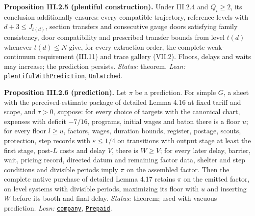 \documentclass[
  letterpaper,
  11pt]{article}
\begin{document}
\textbf{Proposition III.2.5 (plentiful construction).} Under III.2.4 and
\(Q_i\ge2\), its conclusion additionally ensures: every compatible
trajectory, reference levels with \(d+3\le J_{t(d)}\), section transfers
and consecutive gauge doors satisfying family consistency, door
compatibility and prescribed transfer bounds from level \(t(d)\)
whenever \(t(d)\le N\) give, for every extraction order, the complete
weak-continuum requirement (III.11) and trace gallery (VII.2). Floors,
delays and waits may increase; the prediction persists. \emph{Status:}
theorem. \emph{Lean:}
\href{https://github.com/yang-mills-group/OpenAI-YM-20261028/blob/3456e5e75cf8d4cd558955a5c7638fba2d68f464/YM/Integration/RG05Preconstruction/Bardo.lean\#L26-L81}{\texttt{plentifulWithPrediction}},
\href{https://github.com/yang-mills-group/OpenAI-YM-20261028/blob/3456e5e75cf8d4cd558955a5c7638fba2d68f464/YM/FullVolume/Unlatch.lean\#L25-L34}{\texttt{Unlatched}}.

\textbf{Proposition III.2.6 (prediction).} Let \(\pi\) be a prediction.
For simple \(G\), a sheet with the perceived-estimate package of
detailed Lemma 4.16 at fixed tariff and scope, and \(\tau>0\), suppose:
for every choice of targets with the canonical chart, expenses with
deficit \(-7/16\), programs, initial wages and baton there is a floor
\(u\); for every floor \(l\ge u\), factors, wages, duration bounds,
register, postage, scouts, protection, step records with
\(\varepsilon\le1/4\) on transitions with output stage at least the
first stage, post-\(L\) costs and delay \(V\), there is \(W\ge V\); for
every later delay, barrier, wait, pricing record, directed datum and
remaining factor data, shelter and step conditions and divisible periods
imply \(\pi\) on the assembled factor. Then the complete native purchase
of detailed Lemma 4.17 retains \(\pi\) on the emitted factor, on level
systems with divisible periods, maximizing its floor with \(u\) and
inserting \(W\) before its booth and final delay. \emph{Status:}
theorem; used with vacuous prediction. \emph{Lean:}
\href{https://github.com/yang-mills-group/OpenAI-YM-20261028/blob/3456e5e75cf8d4cd558955a5c7638fba2d68f464/YM/Integration/NativeSelection/FundedCompanySelection.lean\#L49-L106}{\texttt{company}},
\href{https://github.com/yang-mills-group/OpenAI-YM-20261028/blob/3456e5e75cf8d4cd558955a5c7638fba2d68f464/YM/Integration/NativeSelection/FundedCompanySelection.lean\#L30-L42}{\texttt{Prepaid}}.
\end{document}
